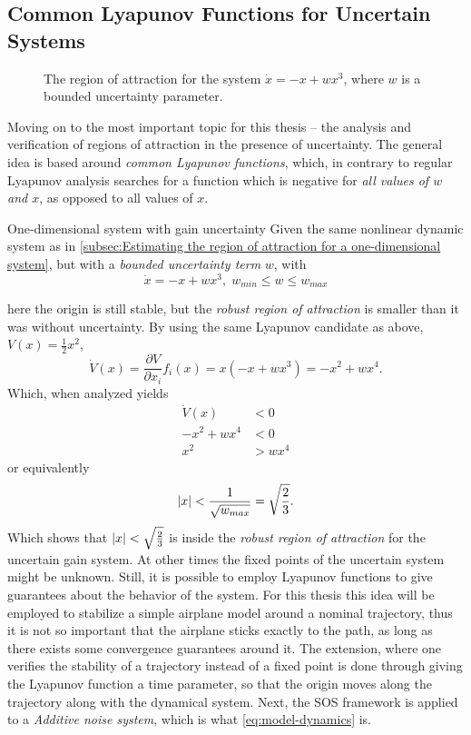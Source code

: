 \subsection{Common Lyapunov Functions for Uncertain Systems}

\begin{figure}
  \centering
  
  \caption{The region of attraction for the system \(\dot{x} = -x + wx^3\),
    where \(w\) is a bounded uncertainty parameter.}
\end{figure}

Moving on to the most important topic for this thesis -- the analysis and
verification of regions of attraction in the presence of uncertainty. The
general idea is based around \textit{common Lyapunov functions}, which, in
contrary to regular Lyapunov analysis searches for a function which is negative
for \textit{all values of \(w\) and \(x\)}, as opposed to all values of \(x\).
\begin{example}{One-dimensional system with gain uncertainty}
  Given the same nonlinear dynamic system as in \cref{subsec:Estimating the
    region of attraction for a one-dimensional system}, but with a
  \textit{bounded uncertainty term} \(w\), with
  \[
    \dot{x} = -x + wx^3, \; w_{min} \leq w \leq w_{max}
  \]
\end{example}
here the origin is still stable, but the \textit{robust region of attraction} is
smaller than it was without uncertainty. By using the same Lyapunov candidate as
above, \(V(x) = \frac{1}{2}x^2\),
\[
  \dot{V}(x) = \frac{\partial V}{\partial x_i} f_i(x) = x(-x + wx^3) = -x^2 +
  wx^4.
\]
Which, when analyzed yields
\begin{align*}
  \dot{V}(x) &< 0 \\
  -x^2 + wx^4 &< 0 \\
  x^2 &> wx^4
\end{align*}
or equivalently
\[
  \lvert x\rvert < \frac{1}{\sqrt{w_{max}}} = \sqrt{\frac{2}{3}}.
\]
Which shows that \(\lvert x\rvert < \sqrt{\frac{2}{3}}\) is inside the \textit{robust
  region of attraction} for the uncertain gain system. At other times the fixed
points of the uncertain system might be unknown. Still, it is possible to employ
Lyapunov functions to give guarantees about the behavior of the system. For this
thesis this idea will be employed to stabilize a simple airplane model around a
nominal trajectory, thus it is not so important that the airplane sticks exactly
to the path, as long as there exists some convergence guarantees around it. The
extension, where one verifies the stability of a trajectory instead of a fixed
point is done through giving the Lyapunov function a time parameter, so that the
origin moves along the trajectory along with the dynamical system. Next, the
\ac{SOS} framework is applied to a \textit{Additive noise system}, which is what
\cref{eq:model-dynamics} is.


